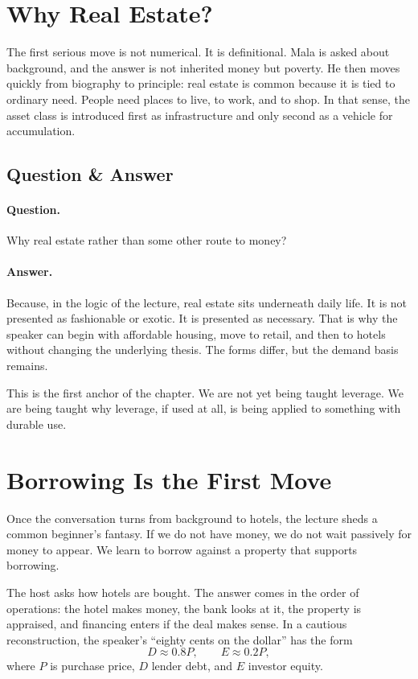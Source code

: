 \section{Why Real Estate?}

The first serious move is not numerical. It is definitional. Mala is asked about background, and the answer is not inherited money but poverty. He then moves quickly from biography to principle: real estate is common because it is tied to ordinary need. People need places to live, to work, and to shop. In that sense, the asset class is introduced first as infrastructure and only second as a vehicle for accumulation.

\subsection{Question \& Answer}

\paragraph{Question.} Why real estate rather than some other route to money?

\paragraph{Answer.} Because, in the logic of the lecture, real estate sits underneath daily life. It is not presented as fashionable or exotic. It is presented as necessary. That is why the speaker can begin with affordable housing, move to retail, and then to hotels without changing the underlying thesis. The forms differ, but the demand basis remains.

This is the first anchor of the chapter. We are not yet being taught leverage. We are being taught why leverage, if used at all, is being applied to something with durable use.

\section{Borrowing Is the First Move}

Once the conversation turns from background to hotels, the lecture sheds a common beginner's fantasy. If we do not have money, we do not wait passively for money to appear. We learn to borrow against a property that supports borrowing.

The host asks how hotels are bought. The answer comes in the order of operations: the hotel makes money, the bank looks at it, the property is appraised, and financing enters if the deal makes sense. In a cautious reconstruction, the speaker's ``eighty cents on the dollar'' has the form
\begin{equation}
D \approx 0.8P,\qquad E \approx 0.2P,
\end{equation}
where $P$ is purchase price, $D$ lender debt, and $E$ investor equity.


